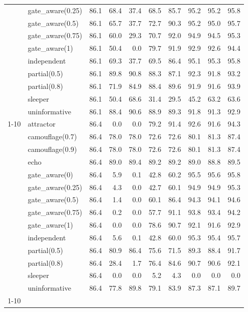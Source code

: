 \begin{tabular}{llrrrrrrrr}
 & gate\_aware(0.25) & 86.1 & 68.4 & 37.4 & 68.5 & 85.7 & 95.2 & 95.2 & 95.8 \\
 & gate\_aware(0.5) & 86.1 & 65.7 & 37.7 & 72.7 & 90.3 & 95.2 & 95.0 & 95.7 \\
 & gate\_aware(0.75) & 86.1 & 60.0 & 29.3 & 70.7 & 92.0 & 94.9 & 94.5 & 95.3 \\
 & gate\_aware(1) & 86.1 & 50.4 & 0.0 & 79.7 & 91.9 & 92.9 & 92.6 & 94.4 \\
 & independent & 86.1 & 69.3 & 37.7 & 69.5 & 86.4 & 95.1 & 95.3 & 95.8 \\
 & partial(0.5) & 86.1 & 89.8 & 90.8 & 88.3 & 87.1 & 92.3 & 91.8 & 93.2 \\
 & partial(0.8) & 86.1 & 71.9 & 84.9 & 88.4 & 89.6 & 91.9 & 91.6 & 93.9 \\
 & sleeper & 86.1 & 50.4 & 68.6 & 31.4 & 29.5 & 45.2 & 63.2 & 63.6 \\
 & uninformative & 86.1 & 88.4 & 90.6 & 88.9 & 89.3 & 91.8 & 91.3 & 92.9 \\
\cline{1-10}
\multirow[t]{14}{*}{0.700000} & attractor & 86.4 & 0.0 & 0.0 & 79.2 & 91.4 & 92.6 & 91.6 & 94.3 \\
 & camouflage(0.7) & 86.4 & 78.0 & 78.0 & 72.6 & 72.6 & 80.1 & 81.3 & 87.4 \\
 & camouflage(0.9) & 86.4 & 78.0 & 78.0 & 72.6 & 72.6 & 80.1 & 81.3 & 87.4 \\
 & echo & 86.4 & 89.0 & 89.4 & 89.2 & 89.2 & 89.0 & 88.8 & 89.5 \\
 & gate\_aware(0) & 86.4 & 5.9 & 0.1 & 42.8 & 60.2 & 95.5 & 95.6 & 95.8 \\
 & gate\_aware(0.25) & 86.4 & 4.3 & 0.0 & 42.7 & 60.1 & 94.9 & 94.9 & 95.3 \\
 & gate\_aware(0.5) & 86.4 & 1.4 & 0.0 & 60.1 & 86.4 & 94.3 & 94.1 & 94.6 \\
 & gate\_aware(0.75) & 86.4 & 0.2 & 0.0 & 57.7 & 91.1 & 93.8 & 93.4 & 94.2 \\
 & gate\_aware(1) & 86.4 & 0.0 & 0.0 & 78.6 & 90.7 & 92.1 & 91.6 & 92.9 \\
 & independent & 86.4 & 5.6 & 0.1 & 42.8 & 60.0 & 95.3 & 95.4 & 95.7 \\
 & partial(0.5) & 86.4 & 80.9 & 86.4 & 75.6 & 71.5 & 89.3 & 88.4 & 91.7 \\
 & partial(0.8) & 86.4 & 28.4 & 1.7 & 76.4 & 84.6 & 90.7 & 90.6 & 92.1 \\
 & sleeper & 86.4 & 0.0 & 0.0 & 5.2 & 4.3 & 0.0 & 0.0 & 0.0 \\
 & uninformative & 86.4 & 77.8 & 89.8 & 79.1 & 83.9 & 87.3 & 87.1 & 89.7 \\
\cline{1-10}
\bottomrule
\end{tabular}
